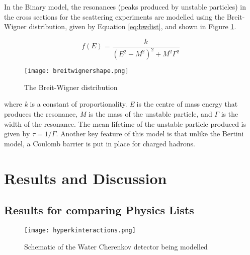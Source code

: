\documentclass[11pt,oneside,a4paper]{article}
\begin{document}
In the Binary model, the resonances (peaks produced by unstable particles) in the cross sections for the scattering experiments are modelled using the Breit-Wigner distribution, given by Equation \ref{eq:bwdist}, and shown in Figure \ref{fig:wig}.

\begin{equation}
\label{eq:bwdist}
f(E)=\frac{k}{(E^2 - M^2)^2 + M^2\Gamma^2}
\end{equation}

\begin{figure}
	\centering
\texttt{[image: breitwignershape.png]}
\caption{The Breit-Wigner distribution}
\label{fig:wig}
\end{figure}

where \textit{k} is a constant of proportionality. \textit{E} is the centre of mass energy that produces the resonance, \textit{M} is the mass of the unstable particle, and \textit{$\Gamma$} is the width of the resonance. The mean lifetime of the unstable particle produced is given by $\tau = 1/\Gamma$. Another key feature of this model is that unlike the Bertini model, a Coulomb barrier is put in place for charged hadrons.



\section{Results and Discussion}
\subsection{Results for comparing Physics Lists}

\begin{figure}[htbp]
	\centering
	\texttt{[image: hyperkinteractions.png]}
	\captionsetup{justification=centering}
	\caption{Schematic of the Water Cherenkov detector being modelled}
	\label{fig:detectordrawings}
\end{figure}
\end{document}
